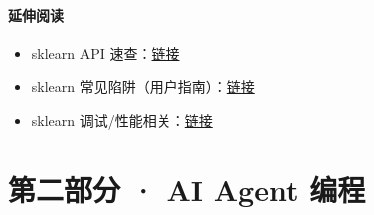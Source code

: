 \subsection{延伸阅读}\label{ux5ef6ux4f38ux9605ux8bfb-38}

\begin{itemize}
\tightlist
\item
  sklearn API
  速查：\href{https://scikit-learn.org/stable/modules/classes.html}{链接}
\item
  sklearn
  常见陷阱（用户指南）：\href{https://scikit-learn.org/stable/modules/preprocessing.html}{链接}
\item
  sklearn
  调试/性能相关：\href{https://scikit-learn.org/stable/developers/performance.html}{链接}
\end{itemize}

\newpage

\part{第二部分 · AI Agent 编程}

\newpage
